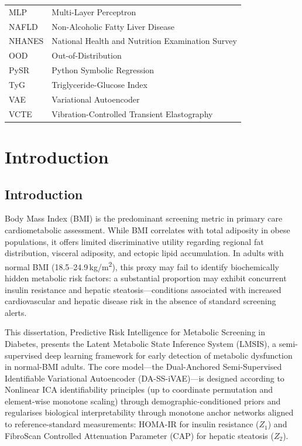 \documentclass[12pt,a4paper,oneside]{report}
\newcommand{\daivae}{DA-SS-iVAE}
\begin{document}
\begin{tabular}{@{}ll@{}}
MLP       & Multi-Layer Perceptron \\
NAFLD     & Non-Alcoholic Fatty Liver Disease \\
NHANES    & National Health and Nutrition Examination Survey \\
OOD       & Out-of-Distribution \\
PySR      & Python Symbolic Regression \\
TyG       & Triglyceride-Glucose Index \\
VAE       & Variational Autoencoder \\
VCTE      & Vibration-Controlled Transient Elastography \\
\bottomrule
\end{tabular}

\clearpage
{}
\setcounter{page}{1}

\chapter{Introduction}

\section{Introduction}

Body Mass Index (BMI) is the predominant screening metric in primary care cardiometabolic assessment. While BMI correlates with total adiposity in obese populations, it offers limited discriminative utility regarding regional fat distribution, visceral adiposity, and ectopic lipid accumulation. In adults with normal BMI (18.5--24.9\,kg/m\textsuperscript{2}), this proxy may fail to identify biochemically hidden metabolic risk factors: a substantial proportion may exhibit concurrent insulin resistance and hepatic steatosis---conditions associated with increased cardiovascular and hepatic disease risk in the absence of standard screening alerts.

This dissertation, Predictive Risk Intelligence for Metabolic Screening in Diabetes, presents the Latent Metabolic State Inference System (LMSIS), a semi-supervised deep learning framework for early detection of metabolic dysfunction in normal-BMI adults. The core model---the Dual-Anchored Semi-Supervised Identifiable Variational Autoencoder (\daivae{})---is designed according to Nonlinear ICA identifiability principles (up to coordinate permutation and element-wise monotone scaling) through demographic-conditioned priors and regularises biological interpretability through monotone anchor networks aligned to reference-standard measurements: HOMA-IR for insulin resistance ($Z_1$) and FibroScan Controlled Attenuation Parameter (CAP) for hepatic steatosis ($Z_2$).
\end{document}
